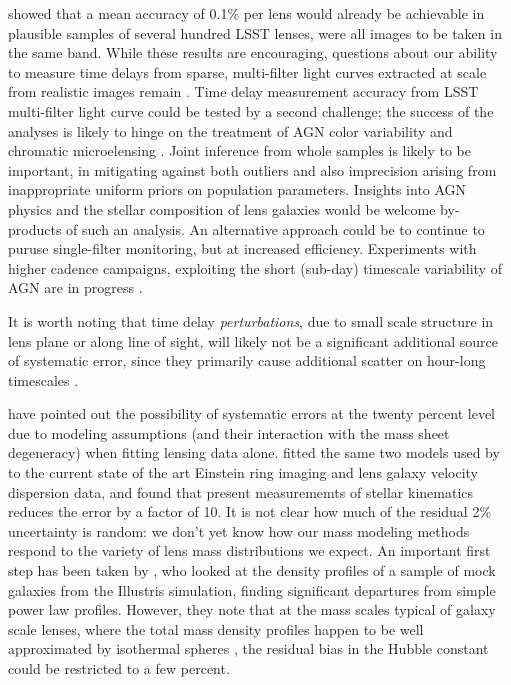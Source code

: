 
\citet{LiaoEtal2015} showed that a 
mean accuracy of 0.1\% per lens would already be achievable in
plausible samples of several hundred LSST lenses, were all images to
be taken in the same band.  While these results are encouraging,
questions about our ability to measure time delays from sparse,
multi-filter light curves extracted at scale from realistic images
remain \citep{TCM13}.  Time delay measurement accuracy from LSST
multi-filter light curve could be tested by a second challenge; the
success of the analyses is likely to hinge on the treatment of AGN
color variability \citep[see e.g.\ ][and references therein]{SunEtal2014}
and chromatic  microelensing
\citep[see e.g.][and references therein]{HainlineEtal2013}.
Joint inference from whole samples is likely to
be important, in mitigating against both outliers and also imprecision
arising from inappropriate uniform priors on  population parameters.
Insights into AGN physics and the stellar composition  of lens galaxies
would be welcome by-products of such an analysis. An alternative approach
could be to continue to puruse single-filter monitoring, but at
increased efficiency. Experiments with higher cadence campaigns,
exploiting the short (sub-day) timescale variability of AGN are in
progress \citep[][F.~Courbin, priv.\ comm.]{BorosonEtal2016}.

It is worth noting that time delay {\it perturbations},  due to small
scale structure in lens plane or along line of sight, will likely not be
a significant  additional source of systematic error, since they
primarily cause additional  scatter on hour-long timescales
\citep{K+M09}.


\citet{S+S13} have pointed out the possibility of systematic errors at
the twenty percent level due to modeling assumptions (and their
interaction with the mass sheet degeneracy) when  fitting lensing data
alone.   \citet{Suy++14} fitted the same two models used by
\citet{S+S13}  to the current state of the art Einstein ring imaging and
lens galaxy velocity dispersion data, and found that present
measurememts of stellar kinematics reduces the error by a factor of
10.  It is not clear how much of the residual 2\% uncertainty is
random: we don't yet know how our mass modeling methods respond to the
variety of lens mass distributions we expect. An important first step
has been taken by \citet{XuEtal2016}, who looked at the density
profiles of a sample of mock galaxies from the Illustris simulation,
finding significant departures from simple power law
profiles. However, they note that at the mass scales typical of galaxy
scale lenses, where the total mass density profiles happen to be well
approximated by isothermal spheres \citep{Koo++09,Aug++10}, the
residual bias in the Hubble constant could be restricted to a few
percent.

